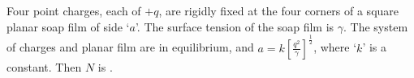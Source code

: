 
\item Four point charges, each of $+q$, are rigidly fixed at the four corners of a square planar soap film of side `$a$'. The surface tension of the soap film is $\gamma$. The system of charges and planar film are in equilibrium, and $a = k \left[ \frac{q^2}{\gamma} \right]^{\frac{1}{2}}$, where `$k$' is a constant. Then $N$ is \underline{\hspace{2.5cm}}.
